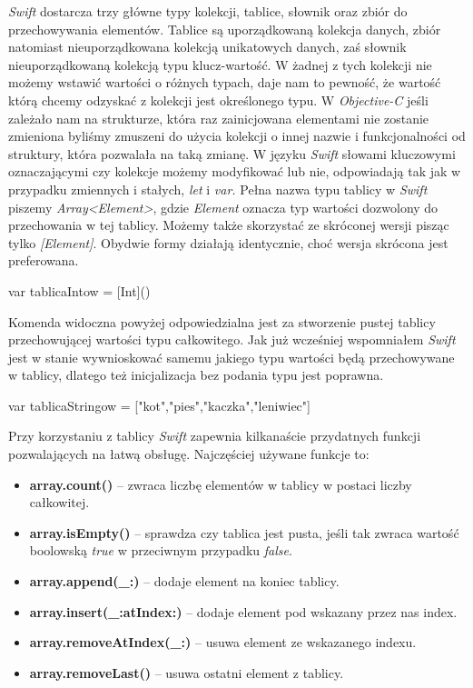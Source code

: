 \documentclass{iiuwb}
\begin{document}
\textit{Swift} dostarcza trzy główne typy kolekcji, tablice, słownik oraz zbiór do przechowywania elementów. Tablice są uporządkowaną kolekcja danych, zbiór natomiast nieuporządkowana kolekcją unikatowych danych, zaś słownik nieuporządkowaną kolekcją typu klucz-wartość. W żadnej z tych kolekcji nie możemy wstawić wartości o różnych typach, daje nam to pewność, że wartość którą chcemy odzyskać z kolekcji jest określonego typu. 
W \textit{Objective-C} jeśli zależało nam na strukturze, która raz zainicjowana elementami nie zostanie zmieniona byliśmy zmuszeni do użycia kolekcji o innej nazwie i funkcjonalności od struktury, która pozwalała na taką zmianę. W języku \textit{Swift} słowami kluczowymi oznaczającymi czy kolekcje możemy modyfikować lub nie, odpowiadają tak jak w przypadku zmiennych i stałych, \textit{let} i \textit{var.}
Pełna nazwa typu tablicy w \textit{Swift} piszemy \textit{Array<Element>}, gdzie \textit{Element} oznacza typ wartości dozwolony do przechowania w tej tablicy. Możemy także skorzystać ze skróconej wersji pisząc tylko \textit{[Element]}. Obydwie formy działają identycznie, choć wersja skrócona jest preferowana. 
\begin{center}
	var tablicaIntow = [Int]()
\end{center}
Komenda widoczna powyżej odpowiedzialna jest za stworzenie pustej tablicy przechowującej wartości typu całkowitego. Jak już wcześniej wspomniałem \textit{Swift} jest w stanie wywnioskować samemu jakiego typu wartości będą przechowywane w tablicy, dlatego też inicjalizacja bez podania typu jest poprawna.
\begin{center}
	var tablicaStringow = ["kot","pies","kaczka","leniwiec"]
\end{center}
Przy korzystaniu z tablicy \textit{Swift} zapewnia kilkanaście przydatnych funkcji pozwalających na łatwą obsługę. Najczęściej używane funkcje to:
\begin{itemize}
\item \textbf{array.count()} -- zwraca liczbę elementów w tablicy w postaci liczby całkowitej.
\item \textbf{array.isEmpty()} -- sprawdza czy tablica jest pusta, jeśli tak zwraca wartość boolowską \textit{true} w przeciwnym przypadku \textit{false}.
\item \textbf{array.append(\_:)} -- dodaje element na koniec tablicy.
\item \textbf{array.insert(\_:atIndex:)} -- dodaje element pod wskazany przez nas index.
\item \textbf{array.removeAtIndex(\_:)} -- usuwa element ze wskazanego indexu.
\item \textbf{array.removeLast()} -- usuwa ostatni element z tablicy.
\end{itemize}
\end{document}
